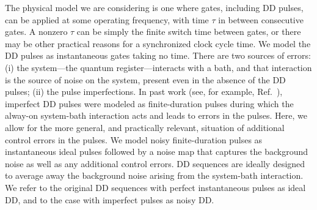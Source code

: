 \documentclass[pra,reprint,superscriptaddress]{revtex4-2}
\begin{document}
The physical model we are considering is one where gates, including DD pulses, can be applied at some operating frequency, with time $\tau$ in between consecutive gates. A nonzero $\tau$ can be simply the finite switch time between gates, or there may be other practical reasons for a synchronized clock cycle time. We model the DD pulses as instantaneous gates taking no time. There are two sources of errors: (i) the system---the quantum register---interacts with a bath, and that interaction is the source of noise on the system, present even in the absence of the DD pulses; (ii) the pulse imperfections. In past work (see, for example, Ref.~\cite{khodjasteh2005fault}), imperfect DD pulses were modeled as finite-duration pulses during which the alway-on system-bath interaction acts and leads to errors in the pulses. Here, we allow for the more general, and practically relevant, situation of additional control errors in the pulses. We model noisy finite-duration pulses as instantaneous ideal pulses followed by a noise map that captures the background noise as well as any additional control errors. DD sequences are ideally designed to average away the background noise arising from the system-bath interaction. We refer to the original DD sequences with perfect instantaneous pulses as ideal DD, and to the case with imperfect pulses as noisy DD.
\end{document}
